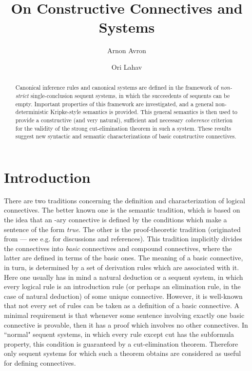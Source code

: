\documentclass{LMCS}
\theoremstyle{remark}
\begin{document}
\title[On Constructive Connectives and Systems]
{On Constructive Connectives and Systems}

\author[A.~Avron]{Arnon Avron}	\address{School of Computer Science, Tel Aviv University, Israel}	  

\author[O.~Lahav]{Ori Lahav}	\address{ pt}	







\begin{abstract}
Canonical inference rules and canonical systems are
defined in the framework of {\em non-strict} single-conclusion sequent 
systems, in which the succeedents of sequents can be empty.
Important properties of this framework are investigated,
and a general non-deterministic Kripke-style semantics is provided.
This general semantics is then used  to
provide a constructive (and very
natural), sufficient and necessary {\em coherence} criterion for
the validity of the strong  cut-elimination theorem in such a system.
These results suggest new syntactic and semantic 
characterizations of basic constructive connectives.
\end{abstract}

\maketitle

\section{Introduction}

There are two traditions concerning the definition and 
characterization of logical connectives. 
The better known one is the semantic tradition, which is
based on the idea that an -ary connective 
is defined by the conditions which make
a sentence of the form  
{\em true}. The other is the proof-theoretic tradition (originated
from \cite{gentzen69} ---  see e.g.  \cite{handbook-sundholm} for discussions and references).
This tradition implicitly divides the connectives into {\em basic} connectives and compound connectives,
where the latter are defined in terms of the basic ones. 
The meaning of a basic connective, in turn, is determined by 
a set of derivation rules which are associated with it. 
Here one usually has in mind a natural deduction or a sequent system,
in which every logical rule is an introduction rule
(or perhaps an elimination rule, in the case of natural deduction) 
of some unique connective.
However, it is well-known that not every set of rules can be taken as a definition of a 
basic connective. 
A minimal requirement is that whenever some sentence involving exactly one basic connective
is provable, then it has a proof which involves no other connectives.
In ``normal" sequent systems, in which every rule except cut has the subformula property,
this condition is guaranteed by a cut-elimination theorem. Therefore only sequent systems for which
such a theorem obtains are considered as useful for defining connectives.
\end{document}
